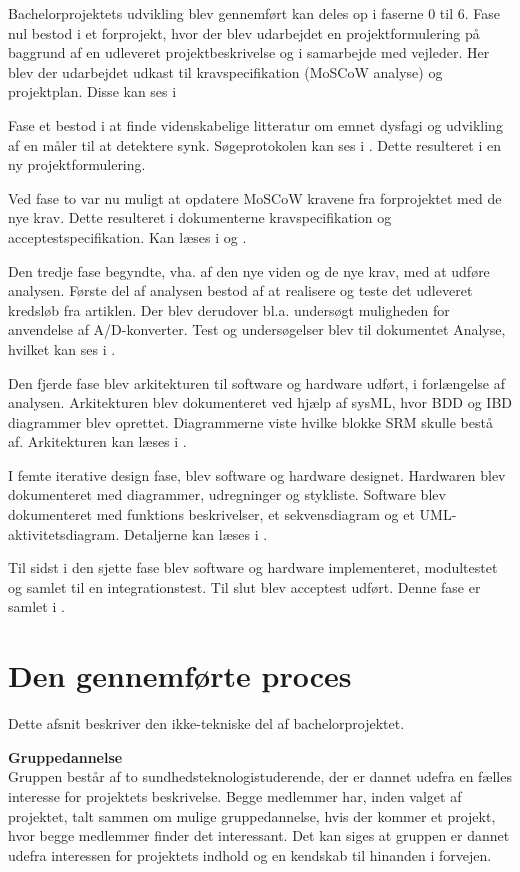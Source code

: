 Bachelorprojektets udvikling blev gennemført kan deles op i faserne 0 til 6. Fase nul bestod i et forprojekt, hvor der blev udarbejdet en projektformulering på baggrund af en udleveret projektbeskrivelse og i samarbejde med vejleder. Her blev der udarbejdet udkast til kravspecifikation (MoSCoW analyse) og projektplan. Disse kan ses i 

Fase et bestod i at finde videnskabelige litteratur om emnet dysfagi og udvikling af en måler til at detektere synk. Søgeprotokolen kan ses i . Dette resulteret i en ny projektformulering.

Ved fase to var nu muligt at opdatere MoSCoW kravene fra forprojektet med de nye krav. Dette resulteret i dokumenterne kravspecifikation og acceptestspecifikation. Kan læses i  og .

Den tredje fase begyndte, vha. af den nye viden og de nye krav, med at udføre analysen. Første del af analysen bestod af at realisere og teste det udleveret kredsløb fra artiklen. Der blev derudover bl.a. undersøgt muligheden for anvendelse af A/D-konverter. Test og undersøgelser blev til dokumentet Analyse, hvilket kan ses i .

Den fjerde fase blev arkitekturen til software og hardware udført, i forlængelse af analysen. Arkitekturen blev dokumenteret ved hjælp af sysML, hvor BDD og IBD diagrammer blev oprettet. Diagrammerne viste hvilke blokke SRM skulle bestå af. Arkitekturen kan læses i .

I femte iterative design fase, blev software og hardware designet. Hardwaren blev dokumenteret med diagrammer, udregninger og stykliste. Software blev dokumenteret med funktions beskrivelser, et sekvensdiagram og et UML-aktivitetsdiagram. Detaljerne kan læses i .

Til sidst i den sjette fase blev software og hardware implementeret, modultestet og samlet til en integrationstest. Til slut blev acceptest udført. Denne fase er samlet i .

\section{Den gennemførte proces}

Dette afsnit beskriver den ikke-tekniske del af bachelorprojektet.

\textbf{Gruppedannelse}\\
Gruppen består af to sundhedsteknologistuderende, der er dannet udefra en fælles interesse for projektets beskrivelse. Begge medlemmer har, inden valget af projektet, talt sammen om mulige gruppedannelse, hvis der kommer et projekt, hvor begge medlemmer finder det interessant. Det kan siges at gruppen er dannet udefra interessen for projektets indhold og en kendskab til hinanden i forvejen. 

